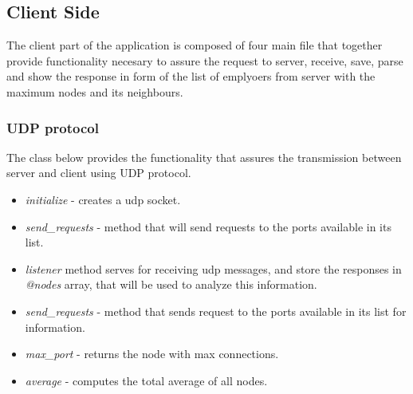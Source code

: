 \documentclass[12pt]{article}
\begin{document}
    \subsection{Client Side}

    The client part of the application is composed of four main file that together provide functionality
    necesary to assure the request to server, receive, save, parse and show the response in form of the
    list of emplyoers from server with the maximum nodes and its neighbours.

    \subsubsection{UDP protocol}

    The class below provides the functionality that assures the transmission
    between server and client using UDP protocol.

    \begin{itemize}
      \renewcommand{\labelitemi}{$\circ$}
      \item  \textit{initialize} - creates a udp socket.
      \item \textit{send\_requests} - method that will send requests to the ports available in its list.
      \item \textit{listener} method serves for receiving udp messages, and store the responses in \textit{@nodes} array,
      that will be used to analyze this information.
      \item \textit{send\_requests} - method that sends request to the ports available in its list for information.
      \item \textit{max\_port} - returns the node with max connections.
      \item \textit{average} - computes the total average of all nodes.
    \end{itemize}
\end{document}
